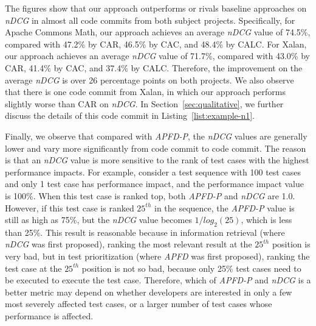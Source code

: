 %

The figures show that our approach outperforms or rivals baseline approaches on \textit{nDCG} in almost all code commits from both subject projects. Specifically, for Apache Commons Math, our approach achieves an average \textit{nDCG} value of 74.5\%, compared with 47.2\% by CAR, 46.5\% by CAC, and 48.4\% by CALC. For Xalan, our approach achieves an average \textit{nDCG} value of 71.7\%, compared with 43.0\% by CAR, 41.4\% by CAC, and 37.4\% by CALC. Therefore, the improvement on the average \textit{nDCG} is over 26 percentage points on both projects. We also observe that there is one code commit from Xalan, in which our approach performs slightly worse than CAR on \textit{nDCG}. In Section~\ref{sec:qualitative}, we further discuss the details of this code commit in Listing~\ref{list:example-n1}.

Finally, we observe that compared with \textit{APFD-P}, the \textit{nDCG} values are generally lower and vary more significantly from code commit to code commit. The reason is that an \textit{nDCG} value is more sensitive to the rank of test cases with the highest performance impacts. For example, consider a test sequence with 100 test cases and only 1 test case has performance impact, and the performance impact value is 100\%. When this test case is ranked top, both \textit{APFD-P} and \textit{nDCG} are 1.0. However, if this test case is ranked $25^{th}$ in the sequence, the \textit{APFD-P} value is still as high as 75\%, but the \textit{nDCG} value becomes $1/log_2(25)$, which is less than 25\%. This result is reasonable because in information retrieval (where \textit{nDCG} was first  proposed), ranking the most relevant result at the $25^{th}$ position is very bad, but in test prioritization (where \textit{APFD} was first proposed), ranking the test case at the $25^{th}$ position is not so bad, because only 25\% test cases need to be executed to execute the test case. Therefore, which of \textit{APFD-P} and \textit{nDCG} is a better metric may depend on whether developers are interested in only a few most severely affected test cases, or a larger number of test cases whose performance is affected. 

